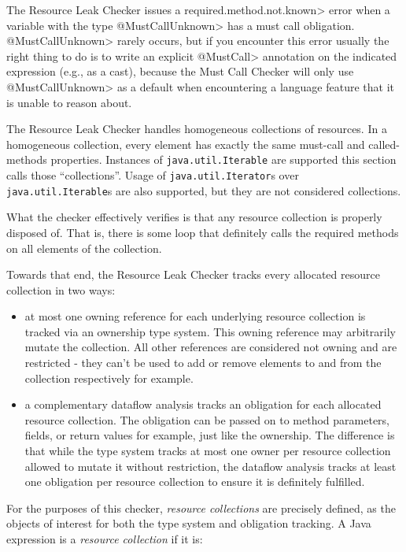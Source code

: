 The Resource Leak Checker issues a \<required.method.not.known> error
when a variable with the type \<@MustCallUnknown> has a must call obligation.
\<@MustCallUnknown> rarely occurs, but if you encounter this error usually
the right thing to do is to write an explicit \<@MustCall> annotation
on the indicated expression (e.g., as a cast), because the Must Call Checker
will only use \<@MustCallUnknown> as a default when encountering a language
feature that it is unable to reason about.


The Resource Leak Checker handles homogeneous collections of resources. In a homogeneous collection, every element
has exactly the same must-call and called-methods properties. Instances of \texttt{java.util.Iterable} are supported this section calls those ``collections''. Usage of \texttt{java.util.Iterator}s over \texttt{java.util.Iterable}s are also supported, but they are not considered collections.

What the checker effectively verifies is that any resource collection is properly disposed of. That is, there is some loop that definitely calls the required methods on all elements of the collection.

Towards that end, the Resource Leak Checker tracks every allocated resource collection in two ways:

\begin{itemize}
  \item at most one owning reference for each underlying resource collection is tracked via an ownership type system. This owning reference may arbitrarily mutate the collection. All other references are considered not owning and are restricted - they can't be used to add or remove elements to and from the collection respectively for example.
  \item a complementary dataflow analysis tracks an obligation for each allocated resource collection. The obligation can be passed on to method parameters, fields, or return values for example, just like the ownership. The difference is that while the type system tracks at most one owner per resource collection allowed to mutate it without restriction, the dataflow analysis tracks at least one obligation per resource collection to ensure it is definitely fulfilled.
\end{itemize}

For the purposes of this checker, \textit{resource collections} are precisely defined, as the objects of interest for both the type system and obligation tracking. A Java expression is a \textit{resource collection} if it is:

